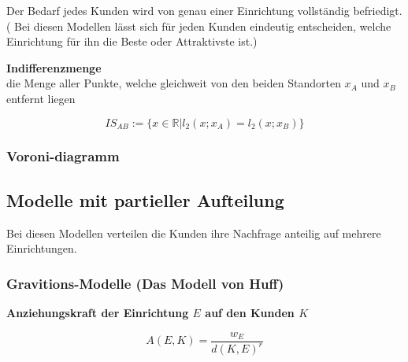       \par Der Bedarf jedes Kunden wird von genau einer Einrichtung vollständig befriedigt. (
      Bei diesen Modellen lässt sich für jeden Kunden eindeutig entscheiden, welche Einrichtung für ihn die Beste oder Attraktivste ist.)

      \begin{defn}
        \textbf{Indifferenzmenge} \\
        die Menge aller Punkte, welche gleichweit von den beiden Standorten $x_A$ und $x_B$ entfernt liegen

        \begin{equation}
          IS_{AB} := \{x \in \mathbb{R} | l_2(x;x_A) = l_2(x; x_B)\}
        \end{equation}
      \end{defn}
      \subsubsection{Voroni-diagramm} %
         \label{ssub:voroni_diagramm}

          \begin{exmp}
            \color{blue}{Aufgabe 5}
          \end{exmp}
         

    \subsection{Modelle mit partieller Aufteilung} %
    \label{sub:modelle_mit_partieller_aufteilung}

      \par Bei diesen Modellen verteilen die Kunden ihre Nachfrage anteilig auf mehrere Einrichtungen.

      \subsubsection{Gravitions-Modelle (Das Modell von Huff)} %
      \label{ssub:gravitions_modelle_}

      \begin{defn}
        \textbf{Anziehungskraft der Einrichtung $E$ auf den Kunden $K$}
      \end{defn}
      
      

      \begin{equation}
        A(E, K) = \frac{w_E}{d(K,E) ^ r}
      \end{equation}

